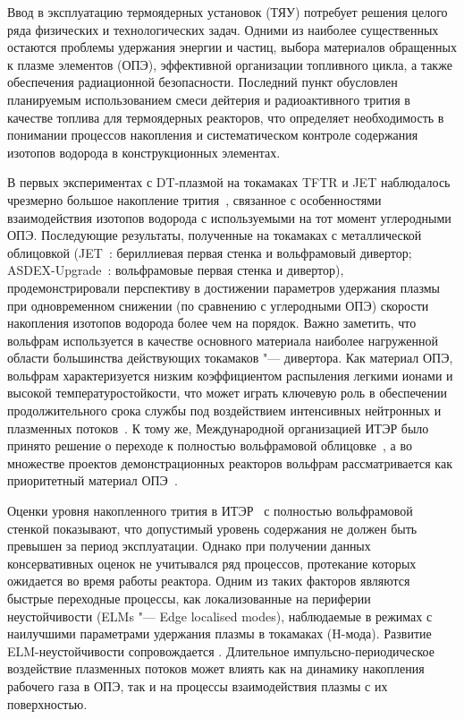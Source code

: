 Ввод в эксплуатацию термоядерных установок (ТЯУ) потребует решения целого ряда физических и технологических задач. Одними из наиболее существенных остаются проблемы удержания энергии и частиц, выбора материалов обращенных к плазме элементов (ОПЭ), эффективной организации топливного цикла, а также обеспечения радиационной безопасности. Последний пункт обусловлен планируемым использованием смеси дейтерия и радиоактивного трития в качестве топлива для термоядерных реакторов, что определяет необходимость в понимании процессов накопления и систематическом контроле содержания изотопов водорода в конструкционных элементах.

В первых экспериментах с DT-плазмой на токамаках TFTR и JET наблюдалось чрезмерно большое накопление трития~\cite{Gasparyan2024}, связанное с особенностями взаимодействия изотопов водорода с используемыми на тот момент углеродными ОПЭ. Последующие результаты, полученные на токамаках с металлической облицовкой (JET~\cite{Maggi2024,Kappatou2025}: бериллиевая первая стенка и вольфрамовый дивертор; ASDEX-Upgrade~\cite{Rohde2009}: вольфрамовые первая стенка и дивертор), продемонстрировали перспективу в достижении  параметров удержания плазмы при одновременном снижении (по сравнению с углеродными ОПЭ) скорости накопления изотопов водорода более чем на порядок. Важно заметить, что вольфрам используется в качестве основного материала наиболее нагруженной области большинства действующих токамаков "--- дивертора. Как материал ОПЭ, вольфрам характеризуется низким коэффициентом распыления легкими ионами и высокой температуростойкости, что может играть ключевую роль в обеспечении продолжительного срока службы под воздействием интенсивных нейтронных и плазменных потоков~\cite{Neu2005}. К тому же, Международной организацией ИТЭР было принято решение о переходе к полностью вольфрамовой облицовке~\cite{Barabaschi2025}, а во множестве проектов демонстрационных реакторов вольфрам рассматривается как приоритетный материал ОПЭ~\cite{Bachmann2016}.

Оценки уровня накопленного трития в ИТЭР~\cite{Roth1,Pitts2025} с полностью вольфрамовой стенкой показывают, что допустимый уровень содержания не должен быть превышен за период эксплуатации. Однако при получении данных консервативных оценок не учитывался ряд процессов, протекание которых ожидается во время работы реактора. Одним из таких факторов являются быстрые переходные процессы, как локализованные на периферии неустойчивости (ELMs "--- Edge localised modes), наблюдаемые в режимах с наилучшими параметрами удержания плазмы в токамаках (H-мода). Развитие ELM-неустойчивости сопровождается . Длительное импульсно-периодическое воздействие плазменных потоков может влиять как на динамику накопления рабочего газа в ОПЭ, так и на процессы взаимодействия плазмы с их поверхностью.

